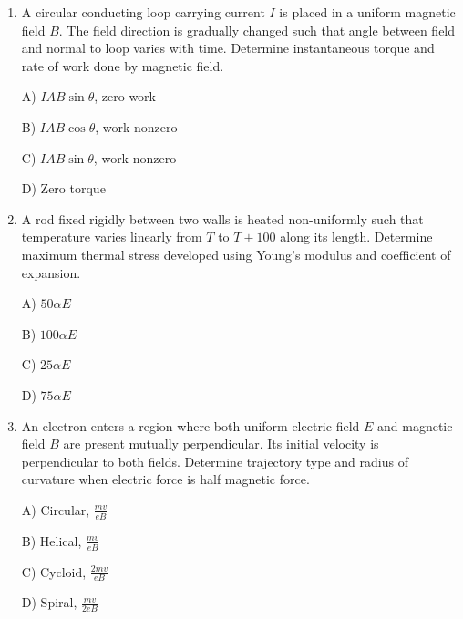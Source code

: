 \documentclass[12pt]{article}
\begin{document}
\begin{enumerate}
\item A circular conducting loop carrying current \(I\) is placed in a uniform magnetic field \(B\). The field direction is gradually changed such that angle between field and normal to loop varies with time. Determine instantaneous torque and rate of work done by magnetic field.

A) \(IAB\sin\theta\), zero work  

B) \(IAB\cos\theta\), work nonzero 

C) \(IAB\sin\theta\), work nonzero  

D) Zero torque  

\item A rod fixed rigidly between two walls is heated non-uniformly such that temperature varies linearly from \(T\) to \(T+100\) along its length. Determine maximum thermal stress developed using Young’s modulus and coefficient of expansion.

A) \(50\alpha E\)  

B) \(100\alpha E\) 

C) \(25\alpha E\)  

D) \(75\alpha E\)

\item An electron enters a region where both uniform electric field \(E\) and magnetic field \(B\) are present mutually perpendicular. Its initial velocity is perpendicular to both fields. Determine trajectory type and radius of curvature when electric force is half magnetic force.

\begin{center}
\end{center}

A) Circular, \(\frac{mv}{eB}\)  

B) Helical, \(\frac{mv}{eB}\)  

C) Cycloid, \(\frac{2mv}{eB}\)  

D) Spiral, \(\frac{mv}{2eB}\)

\end{enumerate}
\end{document}
